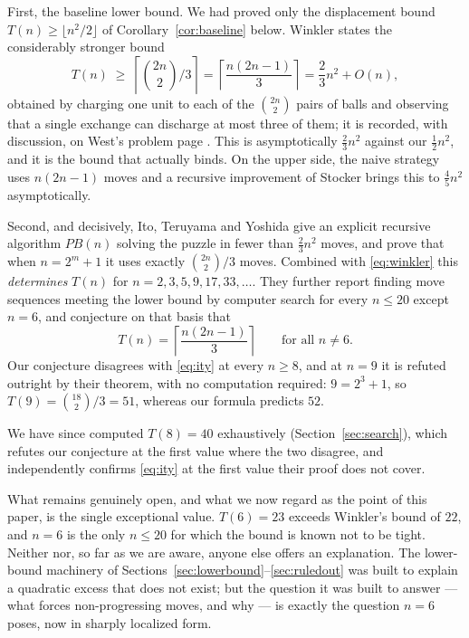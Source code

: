 \documentclass[11pt]{amsart}
\theoremstyle{plain}
\theoremstyle{definition}
\theoremstyle{remark}
\begin{document}
First, the baseline lower bound. We had proved only the displacement bound $T(n)\ge\lfloor n^2/2\rfloor$ of Corollary~\ref{cor:baseline} below. Winkler \cite{Winkler} states the considerably stronger bound
\begin{equation}
\label{eq:winkler}
T(n)\;\ge\;\left\lceil \binom{2n}{2}\Big/3\right\rceil = \left\lceil\frac{n(2n-1)}{3}\right\rceil = \frac{2}{3}n^2 + O(n),
\end{equation}
obtained by charging one unit to each of the $\binom{2n}{2}$ pairs of balls and observing that a single exchange can discharge at most three of them; it is recorded, with discussion, on West's problem page \cite{West}. This is asymptotically $\tfrac{2}{3}n^2$ against our $\tfrac12 n^2$, and it is the bound that actually binds. On the upper side, the naive strategy uses $n(2n-1)$ moves and a recursive improvement of Stocker \cite{Stocker} brings this to $\tfrac45 n^2$ asymptotically.

Second, and decisively, Ito, Teruyama and Yoshida \cite{ITY} give an explicit recursive algorithm $PB(n)$ solving the puzzle in fewer than $\tfrac{2}{3}n^2$ moves, and prove that when $n=2^m+1$ it uses exactly $\binom{2n}{2}/3$ moves. Combined with \eqref{eq:winkler} this \emph{determines} $T(n)$ for $n=2,3,5,9,17,33,\dots$. They further report finding move sequences meeting the lower bound by computer search for every $n\le 20$ except $n=6$, and conjecture on that basis that
\begin{equation}
\label{eq:ity}
T(n) = \left\lceil\frac{n(2n-1)}{3}\right\rceil \qquad\text{for all } n\neq 6.
\end{equation}
Our conjecture disagrees with \eqref{eq:ity} at every $n\ge 8$, and at $n=9$ it is refuted outright by their theorem, with no computation required: $9=2^3+1$, so $T(9)=\binom{18}{2}/3=51$, whereas our formula predicts $52$.

We have since computed $T(8)=40$ exhaustively (Section~\ref{sec:search}), which refutes our conjecture at the first value where the two disagree, and independently confirms \eqref{eq:ity} at the first value their proof does not cover.

What remains genuinely open, and what we now regard as the point of this paper, is the single exceptional value. $T(6)=23$ exceeds Winkler's bound of $22$, and $n=6$ is the only $n\le 20$ for which the bound is known not to be tight. Neither \cite{ITY} nor, so far as we are aware, anyone else offers an explanation. The lower-bound machinery of Sections~\ref{sec:lowerbound}--\ref{sec:ruledout} was built to explain a quadratic excess that does not exist; but the question it was built to answer --- what forces non-progressing moves, and why --- is exactly the question $n=6$ poses, now in sharply localized form.
\end{document}
